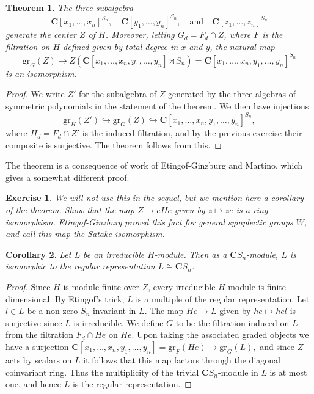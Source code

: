 \documentclass[12pt, reqno]{amsart}
\numberwithin{equation}{section}
\theoremstyle{definition}
\theoremstyle{plain}
\newtheorem{theorem}{Theorem}[section]
\newtheorem{corollary}[theorem]{Corollary}
\newtheorem{exercise}{Exercise}
\newcommand{\CC}{\mathbf{C}}
\begin{document}
\begin{theorem}
The three subalgebra $$	\CC[x_1,\dots,x_n]^{S_n}, \quad \CC[y_1,\dots,y_n]^{S_n}, \quad \text{and} \quad \CC[z_1,\dots,z_n]^{S_n}$$ generate the center $Z$ of $H$. Moreover, letting $G_d=F_d \cap Z$, where $F$ is the filtration on $H$ defined given by total degree in $x$ and $y$, the natural map
$$\mathrm{gr}_G(Z) \rightarrow Z(\CC[x_1,\dots,x_n,y_1,\dots,y_n] \rtimes S_n)=\CC[x_1,\dots,x_n,y_1,\dots,y_n]^{S_n}$$ is an isomorphism. 
\end{theorem}
\begin{proof}
We write $Z'$ for the subalgebra of $Z$ generated by the three algebras of symmetric polynomials in the statement of the theorem. We then have injections
$$\mathrm{gr}_H(Z') \hookrightarrow \mathrm{gr}_G(Z) \hookrightarrow \CC[x_1,\dots,x_n,y_1,\dots,y_n]^{S_n},$$ where $H_d=F_d \cap Z'$ is the induced filtration, and by the previous exercise their composite is surjective. The theorem follows from this.
\end{proof} The theorem is a consequence of work of Etingof-Ginzburg and Martino, which gives a somewhat different proof. 

\begin{exercise}
We will not use this in the sequel, but we mention here a corollary of the theorem. Show that the map $Z \rightarrow eHe$	given by $z \mapsto ze$ is a ring isomorphism. Etingof-Ginzburg proved this fact for general symplectic groups $W$, and call this map the \emph{Satake isomorphism}.
\end{exercise}


\begin{corollary}
Let $L$ be an irreducible $H$-module. Then as a $\CC S_n$-module, $L$ is isomorphic to the regular representation $L \cong \CC S_n$.
\end{corollary}
\begin{proof}
Since $H$ is module-finite over $Z$, every irreducible $H$-module is finite dimensional. By Etingof's trick, $L $ is a multiple of the regular representation. Let $l \in L$ be a non-zero $S_n$-invariant in $L$. The map
$He \rightarrow L$ given by $he \mapsto hel$ is surjective since $L$ is irreducible. We define $G$ to be the filtration induced on $L$ from the filtration $F_d \cap He$ on $He$. Upon taking the associated graded objects we have a surjection
$\CC[x_1,\dots,x_n,y_1,\dots,y_n]=\mathrm{gr}_F(He) \rightarrow \mathrm{gr}_G(L),$ and since $Z$ acts by scalars on $L$ it follows that this map factors through the diagonal coinvariant ring. Thus the multiplicity of the trivial $\CC S_n$-module in $L$ is at most one, and hence $L$ is the regular representation. 
\end{proof}
\end{document}
